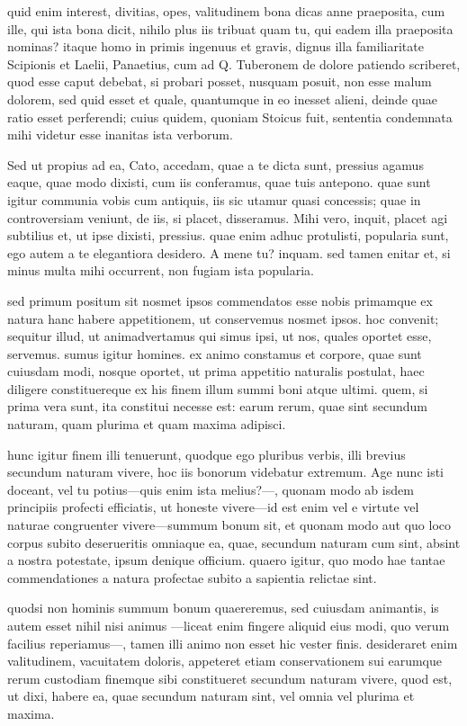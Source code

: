  quid enim interest, divitias, opes, valitudinem bona dicas anne praeposita, cum ille, qui ista bona dicit, nihilo plus iis tribuat quam tu, qui eadem illa praeposita nominas? itaque homo in primis ingenuus et gravis, dignus illa familiaritate Scipionis et Laelii, Panaetius, cum ad Q. Tuberonem de dolore patiendo scriberet, quod esse caput debebat, si probari posset, nusquam posuit, non esse malum dolorem, sed quid esset et quale, quantumque in eo inesset alieni, deinde quae ratio esset perferendi; cuius quidem, quoniam Stoicus fuit, sententia condemnata mihi videtur esse inanitas ista verborum.

 Sed ut propius ad ea, Cato, accedam, quae a te dicta sunt, pressius agamus eaque, quae modo dixisti, cum iis conferamus, quae tuis antepono. quae sunt igitur communia vobis cum antiquis, iis sic utamur quasi concessis; quae in controversiam veniunt, de iis, si placet, disseramus. Mihi vero, inquit, placet agi subtilius et, ut ipse dixisti, pressius. quae enim adhuc protulisti, popularia sunt, ego autem a te elegantiora desidero. A mene tu? inquam. sed tamen enitar et, si minus multa mihi occurrent, non fugiam ista popularia.

 sed primum positum sit nosmet ipsos commendatos esse nobis primamque ex natura hanc habere appetitionem, ut conservemus nosmet ipsos. hoc convenit; sequitur illud, ut animadvertamus qui simus ipsi, ut nos, quales oportet esse, servemus. sumus igitur homines. ex animo constamus et corpore, quae sunt cuiusdam modi, nosque oportet, ut prima appetitio naturalis postulat, haec diligere constituereque ex his finem illum summi boni atque ultimi. quem, si prima vera sunt, ita constitui necesse est: earum rerum, quae sint secundum naturam, quam plurima et quam maxima adipisci.

 hunc igitur finem illi tenuerunt, quodque ego pluribus verbis, illi brevius secundum naturam vivere, hoc iis bonorum videbatur extremum. Age nunc isti doceant, vel tu potius—quis enim ista melius?—, quonam modo ab isdem principiis profecti efficiatis, ut honeste vivere—id est enim vel e virtute vel naturae congruenter vivere—summum bonum sit, et quonam modo aut quo loco corpus subito deserueritis omniaque ea, quae, secundum naturam cum sint, absint a nostra potestate, ipsum denique officium. quaero igitur, quo modo hae tantae commendationes a natura profectae subito a sapientia relictae sint.

 quodsi non hominis summum bonum quaereremus, sed cuiusdam animantis, is autem esset nihil nisi animus —liceat enim fingere aliquid eius modi, quo verum facilius reperiamus—, tamen illi animo non esset hic vester finis. desideraret enim valitudinem, vacuitatem doloris, appeteret etiam conservationem sui earumque rerum custodiam finemque sibi constitueret secundum naturam vivere, quod est, ut dixi, habere ea, quae secundum naturam sint, vel omnia vel plurima et maxima.

